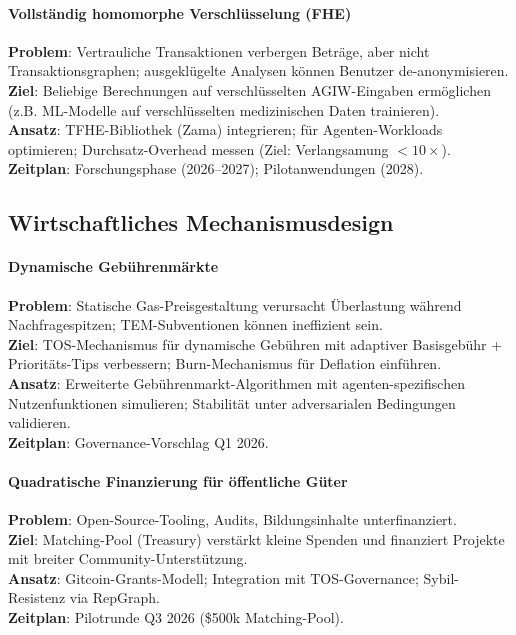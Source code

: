 \documentclass[11pt]{article}
\begin{document}
\paragraph{Vollständig homomorphe Verschlüsselung (FHE)}
\textbf{Problem}: Vertrauliche Transaktionen verbergen Beträge, aber nicht Transaktionsgraphen; ausgeklügelte Analysen können Benutzer de-anonymisieren.\\
\textbf{Ziel}: Beliebige Berechnungen auf verschlüsselten AGIW-Eingaben ermöglichen (z.B. ML-Modelle auf verschlüsselten medizinischen Daten trainieren).\\
\textbf{Ansatz}: TFHE-Bibliothek (Zama) integrieren; für Agenten-Workloads optimieren; Durchsatz-Overhead messen (Ziel: Verlangsamung $<10\times$).\\
\textbf{Zeitplan}: Forschungsphase (2026--2027); Pilotanwendungen (2028).

\subsection{Wirtschaftliches Mechanismusdesign}

\paragraph{Dynamische Gebührenmärkte}
\textbf{Problem}: Statische Gas-Preisgestaltung verursacht Überlastung während Nachfragespitzen; TEM-Subventionen können ineffizient sein.\\
\textbf{Ziel}: TOS-Mechanismus für dynamische Gebühren mit adaptiver Basisgebühr + Prioritäts-Tips verbessern; Burn-Mechanismus für Deflation einführen.\\
\textbf{Ansatz}: Erweiterte Gebührenmarkt-Algorithmen mit agenten-spezifischen Nutzenfunktionen simulieren; Stabilität unter adversarialen Bedingungen validieren.\\
\textbf{Zeitplan}: Governance-Vorschlag Q1 2026.

\paragraph{Quadratische Finanzierung für öffentliche Güter}
\textbf{Problem}: Open-Source-Tooling, Audits, Bildungsinhalte unterfinanziert.\\
\textbf{Ziel}: Matching-Pool (Treasury) verstärkt kleine Spenden und finanziert Projekte mit breiter Community-Unterstützung.\\
\textbf{Ansatz}: Gitcoin-Grants-Modell; Integration mit TOS-Governance; Sybil-Resistenz via RepGraph.\\
\textbf{Zeitplan}: Pilotrunde Q3 2026 (\$500k Matching-Pool).
\end{document}
